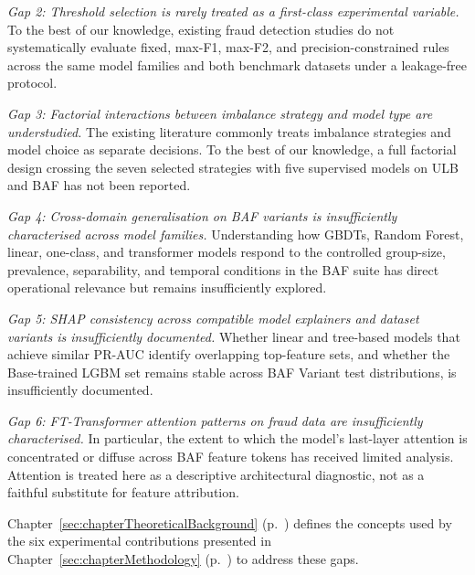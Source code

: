 \textit{Gap 2: Threshold selection is rarely treated as a first-class experimental variable.} To the best of our knowledge, existing fraud detection studies do not systematically evaluate fixed, max-F1, max-F2, and precision-constrained rules across the same model families and both benchmark datasets under a leakage-free protocol.

\textit{Gap 3: Factorial interactions between imbalance strategy and model type are understudied.} The existing literature commonly treats imbalance strategies and model choice as separate decisions. To the best of our knowledge, a full factorial design crossing the seven selected strategies with five supervised models on ULB and BAF has not been reported.

\textit{Gap 4: Cross-domain generalisation on BAF variants is insufficiently characterised across model families.} Understanding how GBDTs, Random Forest, linear, one-class, and transformer models respond to the controlled group-size, prevalence, separability, and temporal conditions in the BAF suite has direct operational relevance but remains insufficiently explored.

\textit{Gap 5: SHAP consistency across compatible model explainers and dataset variants is insufficiently documented.} Whether linear and tree-based models that achieve similar PR-AUC identify overlapping top-feature sets, and whether the Base-trained LGBM set remains stable across BAF Variant test distributions, is insufficiently documented.

\textit{Gap 6: FT-Transformer attention patterns on fraud data are insufficiently characterised.} In particular, the extent to which the model's last-layer attention is concentrated or diffuse across BAF feature tokens has received limited analysis. Attention is treated here as a descriptive architectural diagnostic, not as a faithful substitute for feature attribution.

\enlargethispage{\baselineskip}
Chapter~\ref{sec:chapterTheoreticalBackground} (p.~\pageref{sec:chapterTheoreticalBackground}) defines the concepts used by the six experimental contributions presented in Chapter~\ref{sec:chapterMethodology} (p.~\pageref{sec:chapterMethodology}) to address these gaps.
